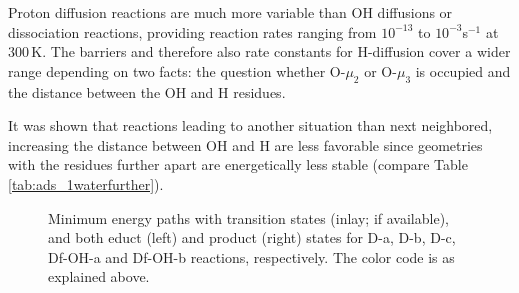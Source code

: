 \documentclass[11pt,DIV=13,BCOR=5mm,a4paper,headinclude]{scrbook}
\begin{document}
Proton diffusion reactions are much more variable than OH diffusions or dissociation reactions, providing reaction rates ranging from $10^{-13}$ to $10^{-3}$s$^{-1}$ at $300\,$K.
The barriers and therefore also rate constants for H-diffusion cover a wider range depending on two facts: the question whether O-$\mu_2$ or O-$\mu_3$ is occupied and the distance between the OH and H residues.


It was shown that reactions leading to another situation than next neighbored, increasing the distance between OH and H are less favorable since geometries with the residues further apart are energetically less stable (compare Table \ref{tab:ads_1waterfurther}).
\begin{figure} [!ht]
\centering
{}
         \quad
{}
 \quad
{}
 \quad
{}
\caption{Minimum energy paths with transition states (inlay; if available), and both educt (left) and product (right) states for D-a, D-b, D-c, Df-OH-a and Df-OH-b reactions, respectively.
The color code is as explained above.}
       \label{mep}
\end{figure}
\end{document}
